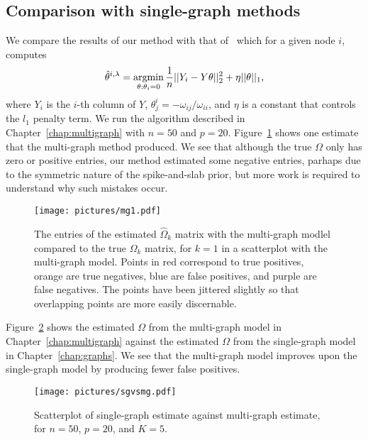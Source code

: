\documentclass[a4paper, 11pt, oneside]{report}
\DeclareMathOperator{\argmin}{argmin}
\newcommand{\1}{\mathds{1}}
\begin{document}
\subsection{Comparison with single-graph methods}
We compare the results of our method with that of~\citet{mein2006} which for a given node $i$, computes
\[\hat{\theta}^{i, \lambda} = \argmin\displaylimits_{\theta : \theta_i = 0}\frac{1}{n} ||Y_i - Y \theta||_2^2 + \eta ||\theta||_1,\]
where $Y_i$ is the $i$-th column of $Y$, $\theta_j^i = -\omega_{ij}/\omega_{ii}$, and $\eta$ is a constant that controls the $l_1$ penalty term.
We run the algorithm described in Chapter~\ref{chap:multigraph} with $n=50$ and $p=20$.
Figure~\ref{fig:omega-mg} shows one estimate that the multi-graph method produced.
We see that although the true $\Omega$ only has zero or positive entries, our method estimated some negative entries,
parhaps due to the symmetric nature of the spike-and-slab prior, but more work is required to understand why such mistakes occur.
\begin{figure}[bt]
	\centering
	\texttt{[image: pictures/mg1.pdf]}
	\caption{The entries of the estimated $\hat \Omega_k$ matrix with the multi-graph modlel compared to the true $\Omega_k$ matrix, for $k = 1$ in
		a scatterplot with the multi-graph model. Points in red correspond to true positives, orange are true negatives, blue are false positives, and purple are false negatives. The points have been jittered slightly so that overlapping points are more easily discernable.}
	\label{fig:omega-mg}
\end{figure}
Figure~\ref{fig:sgvsmg} shows the estimated $\Omega$ from the multi-graph model in Chapter~\ref{chap:multigraph} against the estimated $\Omega$ from the single-graph model in Chapter~\ref{chap:graphs}.
We see that the multi-graph model improves upon the single-graph model by producing fewer false positives.
\begin{figure}[tb]
	\begin{center}
		\texttt{[image: pictures/sgvsmg.pdf]}
	\end{center}
	\caption{Scatterplot of single-graph estimate against multi-graph estimate, for $n=50$, $p=20$, and $K=5$.}
	\label{fig:sgvsmg}
\end{figure}
\end{document}
